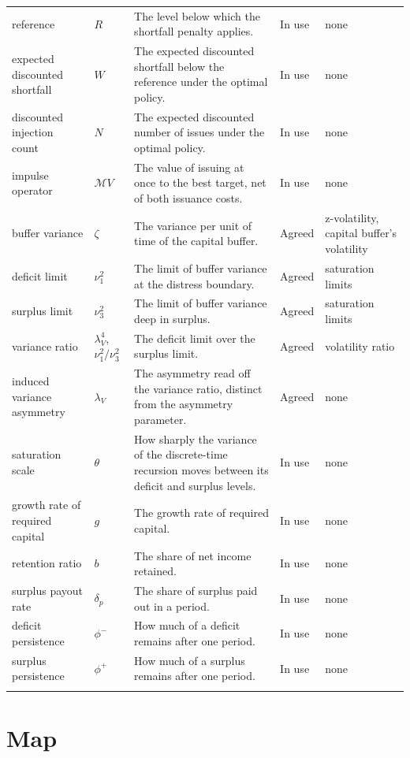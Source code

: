 \documentclass[11pt]{article}
\newcommand{\nrow}[5]{#1 & #2 & #3 & #4 & #5 \\ \addlinespace}
\begin{document}
\begin{longtable}{@{}P{3.0cm}P{2.2cm}P{6.2cm}P{1.4cm}P{2.8cm}@{}}
\nrow{reference}{$R$}{The level below which the shortfall penalty applies.}{In use}{none}
\nrow{expected discounted shortfall}{$W$}{The expected discounted shortfall below the reference under the optimal policy.}{In use}{none}
\nrow{discounted injection count}{$N$}{The expected discounted number of issues under the optimal policy.}{In use}{none}
\nrow{impulse operator}{$\mathcal MV$}{The value of issuing at once to the best target, net of both issuance costs.}{In use}{none}
\nrow{buffer variance}{$\zeta$}{The variance per unit of time of the capital buffer.}{Agreed}{z-volatility, capital buffer's volatility}
\nrow{deficit limit}{$\nu_1^2$}{The limit of buffer variance at the distress boundary.}{Agreed}{saturation limits}
\nrow{surplus limit}{$\nu_3^2$}{The limit of buffer variance deep in surplus.}{Agreed}{saturation limits}
\nrow{variance ratio}{$\lambda_V^4$, $\nu_1^2/\nu_3^2$}{The deficit limit over the surplus limit.}{Agreed}{volatility ratio}
\nrow{induced variance asymmetry}{$\lambda_V$}{The asymmetry read off the variance ratio, distinct from the asymmetry parameter.}{Agreed}{none}
\nrow{saturation scale}{$\theta$}{How sharply the variance of the discrete-time recursion moves between its deficit and surplus levels.}{In use}{none}
\nrow{growth rate of required capital}{$g$}{The growth rate of required capital.}{In use}{none}
\nrow{retention ratio}{$b$}{The share of net income retained.}{In use}{none}
\nrow{surplus payout rate}{$\delta_p$}{The share of surplus paid out in a period.}{In use}{none}
\nrow{deficit persistence}{$\phi^-$}{How much of a deficit remains after one period.}{In use}{none}
\nrow{surplus persistence}{$\phi^+$}{How much of a surplus remains after one period.}{In use}{none}
\bottomrule
\end{longtable}
\normalsize

\section{Map}
\end{document}
